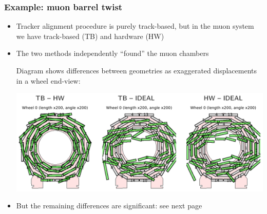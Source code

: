 \documentclass[compress]{beamer}
\begin{document}
\begin{frame}
\frametitle{Example: muon barrel twist}
\begin{itemize}
\item Tracker alignment procedure is purely track-based, but in the
  muon system we have track-based (TB) and hardware (HW)

\item The two methods independently ``found'' the muon chambers

\vspace{0.1 cm}
Diagram shows differences between geometries as exaggerated displacements in a wheel end-view:

\vfill
\includegraphics[width=\linewidth]{tb-hw_wheel0.png}

\vfill
\item But the remaining differences are significant: see next page
\end{itemize}
\end{frame}
\end{document}
